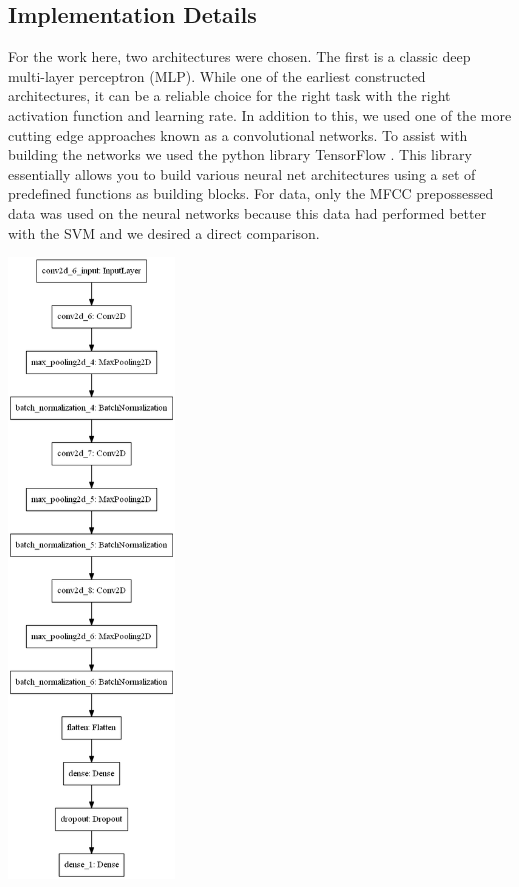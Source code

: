 \documentclass[12pt]{article}
\begin{document}
\begin{multicols*}{2}
\subsection*{Implementation Details}
For the work here, two architectures were chosen. The first is a classic deep multi-layer perceptron (MLP). While one of the earliest constructed architectures, it can be a reliable choice for the right task with the right activation function and learning rate. In addition to this, we used one of the more cutting edge approaches known as a convolutional networks. To assist with building the networks we used the python library TensorFlow \cite{youtube_2020}. This library essentially allows you to build various neural net architectures using a set of predefined functions as building blocks. For data, only the MFCC prepossessed data was used on the neural networks because this data had performed better with the SVM and we desired a direct comparison.

{
    \centering
    \includegraphics[width=1.74in]{figures/multi_input_and_output_model.png}
    \label{cnn_architecture}
}


\end{multicols*}
\end{document}
